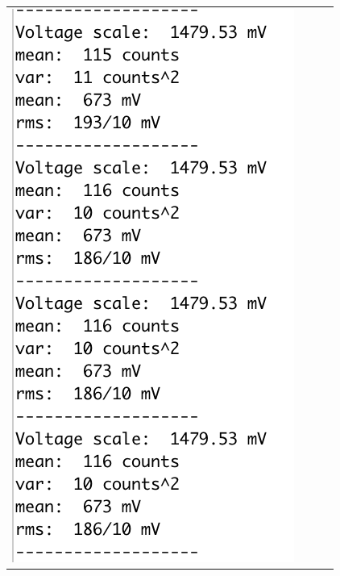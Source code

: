 \documentclass[12pt]{article}
\begin{document}
\begin{figure}[htbp]
\begin{center}
\begin{tabular}{cccc}
{\includegraphics[height=0.30\textheight]{figs/calibc.png}} &

\end{tabular}
\end{center}
\end{figure}
\end{document}
